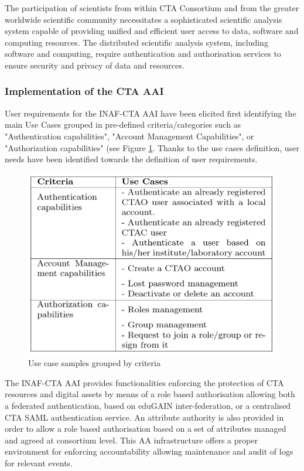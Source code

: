 \documentclass[fleqn,11pt]{wlscirep}
\begin{document}
{The participation of scientists from within CTA Consortium and from the greater worldwide scientific community necessitates a sophisticated scientific analysis system capable of providing unified and efficient user access to data, software and computing resources\cite{cta-data-man}.
The distributed scientific analysis system, including software and computing, require authentication and authorisation services to ensure security and privacy of data and resources.

\subsubsection{Implementation of the CTA AAI}
User requirements for the INAF-CTA AAI have been elicited first identifying the main Use Cases grouped in pre-defined criteria/categories such as "Authentication capabilities", "Account Management Capabilities", or "Authorization capabilities" (see Figure \ref{fig:ctatable}. Thanks to the use cases definition, user needs have been identified towards the definition of user requirements.
 
\begin{figure}[ht!]
  \centering
  \includegraphics[width=0.7\columnwidth]{cta-table.png}
  \caption{Use case samples grouped by criteria}
  \label{fig:ctatable}
\end{figure}

The INAF-CTA AAI provides functionalities enforcing the protection of CTA resources and digital assets by means of a role based authorisation allowing both a federated  authentication, based on eduGAIN inter-federation, or a centralised CTA SAML authentication service. An attribute authority is also provided in order to allow a role based  authorisation based on a set of attributes managed and agreed at consortium level. This AA infrastructure offers a proper environment  for enforcing accountability  allowing  maintenance and audit of logs for relevant events.

}
\end{document}
